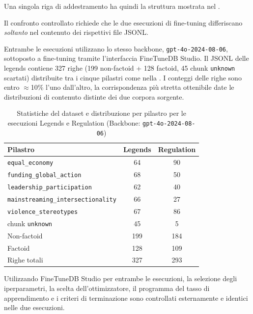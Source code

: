 \documentclass[pdflatex, sn-apa]{sn-jnl}%
\theoremstyle{thmstyleone}%
\theoremstyle{thmstyletwo}%
\theoremstyle{thmstylethree}%
\begin{document}
Una singola riga di addestramento ha quindi la struttura mostrata nel
.

Il confronto controllato richiede che le due esecuzioni di fine-tuning
differiscano \emph{soltanto} nel contenuto dei rispettivi file JSONL.

Entrambe le esecuzioni utilizzano lo stesso backbone,
\texttt{gpt-4o-2024-08-06}, sottoposto a fine-tuning tramite l'interfaccia
FineTuneDB Studio. Il JSONL delle legends contiene 327 righe (199 non-factoid +
128 factoid, 45 chunk \texttt{unknown} scartati) distribuite tra i cinque
pilastri come nella . I conteggi delle righe sono entro
$\approx$10\% l'uno dall'altro, la corrispondenza più stretta ottenibile date le
distribuzioni di contenuto distinte dei due corpora sorgente.


\begin{table}[htbp]
\centering
\caption{Statistiche del dataset e distribuzione per pilastro per le esecuzioni
Legends e Regulation (Backbone: \texttt{gpt-4o-2024-08-06})}
\label{tab:dataset_stats}
\begin{tabular}{@{}lcc@{}}
\toprule
\textbf{Pilastro} & \textbf{Legends} & \textbf{Regulation} \\ \midrule
\texttt{equal\_economy} & 64 & 90 \\
\texttt{funding\_global\_action} & 68 & 50 \\
\texttt{leadership\_participation} & 62 & 40 \\
\texttt{mainstreaming\_intersectionality} & 66 & 27 \\
\texttt{violence\_stereotypes} & 67 & 86 \\ 
chunk \texttt{unknown} & 45 & 5 \\ \midrule
Non-factoid & 199 & 184 \\
Factoid & 128 & 109 \\ 
Righe totali & 327 & 293 \\ \bottomrule
\end{tabular}
\end{table}


Utilizzando FineTuneDB Studio per entrambe le esecuzioni, la selezione degli
iperparametri, la scelta dell'ottimizzatore, il programma del tasso di
apprendimento e i criteri di terminazione sono controllati esternamente e
identici nelle due esecuzioni.

\FloatBarrier

\end{document}

